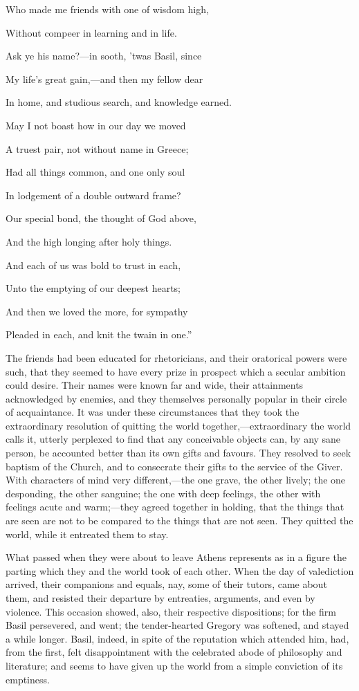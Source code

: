 Who made me friends with one of wisdom high,

Without compeer in learning and in life.

Ask ye his name?—in sooth, 'twas Basil, since

My life's great gain,—and then my fellow dear

In home, and studious search, and knowledge earned. 

May I not boast how in our day we moved

A truest pair, not without name in Greece;

Had all things common, and one only soul

In lodgement of a double outward frame?

Our special bond, the thought of God above,

And the high longing after holy things.

And each of us was bold to trust in each,

Unto the emptying of our deepest hearts;

And then we loved the more, for sympathy

Pleaded in each, and knit the twain in one.''

The friends had been educated for rhetoricians, and their
oratorical powers were such, that they seemed to have every prize in
prospect which a secular ambition could desire. Their names were known
far and wide, their attainments acknowledged by enemies, and they
themselves personally popular in their circle of acquaintance. It was
under these circumstances that they took the extraordinary resolution
of quitting the world together,—extraordinary the world calls it,
utterly perplexed to find that any conceivable objects can, by any
sane person, be accounted better than its own gifts and favours. They
resolved to seek baptism of the Church, and to consecrate their gifts
to the service of the Giver. With characters of mind very different,—the
one grave, the other lively; the one desponding, the other sanguine;
the one with deep feelings, the other with feelings acute and warm;—they
agreed together in holding, that the things that are seen are not to
be compared to the things that are not seen. They quitted the world,
while it entreated them to stay.

What passed when they were about to leave Athens represents as in a
figure the parting which they and the world took of each other. When
the day of valediction arrived, their companions and equals, nay, some
of their tutors, came about them, and resisted their departure by
entreaties, arguments, and even by violence. This occasion showed,
also, their respective dispositions; for the firm Basil persevered,
and went; the tender-hearted Gregory was softened, and stayed a while
longer. Basil, indeed, in spite of the reputation which attended him,
had, from the first, felt disappointment with the celebrated abode of
philosophy and literature; and seems to have given up the world from a
simple conviction of its emptiness.

